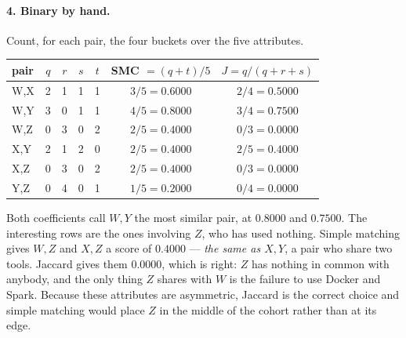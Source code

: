 \documentclass[11pt]{article}
\begin{document}
\paragraph{4. Binary by hand.}
Count, for each pair, the four buckets over the five attributes.
\begin{center}
\begin{tabular}{lcccccc}
  \toprule
  pair & $q$ & $r$ & $s$ & $t$ & SMC $=(q{+}t)/5$ & $J = q/(q{+}r{+}s)$ \\
  \midrule
  W,X & 2 & 1 & 1 & 1 & $3/5 = 0.6000$ & $2/4 = 0.5000$ \\
  W,Y & 3 & 0 & 1 & 1 & $4/5 = 0.8000$ & $3/4 = 0.7500$ \\
  W,Z & 0 & 3 & 0 & 2 & $2/5 = 0.4000$ & $0/3 = 0.0000$ \\
  X,Y & 2 & 1 & 2 & 0 & $2/5 = 0.4000$ & $2/5 = 0.4000$ \\
  X,Z & 0 & 3 & 0 & 2 & $2/5 = 0.4000$ & $0/3 = 0.0000$ \\
  Y,Z & 0 & 4 & 0 & 1 & $1/5 = 0.2000$ & $0/4 = 0.0000$ \\
  \bottomrule
\end{tabular}
\end{center}
Both coefficients call $W,Y$ the most similar pair, at $0.8000$ and
$0.7500$. The interesting rows are the ones involving $Z$, who has used
nothing. Simple matching gives $W,Z$ and $X,Z$ a score of $0.4000$ ---
\emph{the same as $X,Y$}, a pair who share two tools. Jaccard gives them
$0.0000$, which is right: $Z$ has nothing in common with anybody, and the
only thing $Z$ shares with $W$ is the failure to use Docker and Spark.
Because these attributes are asymmetric, Jaccard is the correct choice and
simple matching would place $Z$ in the middle of the cohort rather than at
its edge.
\end{document}
